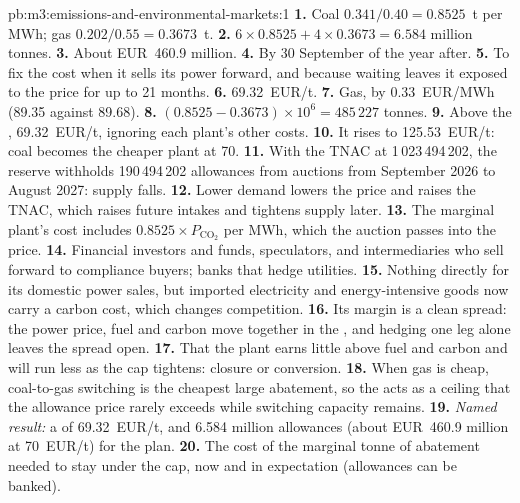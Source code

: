 \begin{solution}{pb:m3:emissions-and-environmental-markets:1}
\textbf{1.} Coal $0.341/0.40 = 0.8525$~t per MWh; gas $0.202/0.55 = 0.3673$~t. \textbf{2.} $6 \times
0.8525 + 4 \times 0.3673 = 6.584$ million tonnes. \textbf{3.} About EUR~460.9 million. \textbf{4.} By
30 September of the year after. \textbf{5.} To fix the cost when it sells its power forward, and because
waiting leaves it exposed to the price for up to 21 months.
\textbf{6.} \qty{69.32}{EUR/t}. \textbf{7.} Gas, by \qty{0.33}{EUR/MWh} (89.35 against 89.68).
\textbf{8.} $(0.8525 - 0.3673) \times 10^6 = 485\,227$ tonnes. \textbf{9.} Above the ,
\qty{69.32}{EUR/t}, ignoring each plant's other costs. \textbf{10.} It rises to \qty{125.53}{EUR/t}:
coal becomes the cheaper plant at \qty{70}{}.
\textbf{11.} With the TNAC at 1\,023\,494\,202, the reserve withholds 190\,494\,202 allowances from
auctions from September 2026 to August 2027: supply falls. \textbf{12.} Lower demand lowers the price
and raises the TNAC, which raises future intakes and tightens supply later. \textbf{13.} The marginal
plant's cost includes $0.8525 \times P_{\mathrm{CO_2}}$ per MWh, which the auction passes into the price.
\textbf{14.} Financial investors and funds, speculators, and intermediaries who sell forward to
compliance buyers; banks that hedge utilities. \textbf{15.} Nothing directly for its domestic power
sales, but imported electricity and energy-intensive goods now carry a carbon cost, which changes
competition. \textbf{16.} Its margin is a clean spread: the power price, fuel and carbon move together
in the , and hedging one leg alone leaves the spread open. \textbf{17.} That the plant earns
little above fuel and carbon and will run less as the cap tightens: closure or conversion. \textbf{18.}
When gas is cheap, coal-to-gas switching is the cheapest large abatement, so the  acts as
a ceiling that the allowance price rarely exceeds while switching capacity remains. \textbf{19.}
\emph{Named result:} a  of \qty{69.32}{EUR/t}, and 6.584 million allowances (about
EUR~460.9 million at \qty{70}{EUR/t}) for the plan. \textbf{20.} The cost of the marginal tonne of
abatement needed to stay under the cap, now and in expectation (allowances can be banked).
\end{solution}


